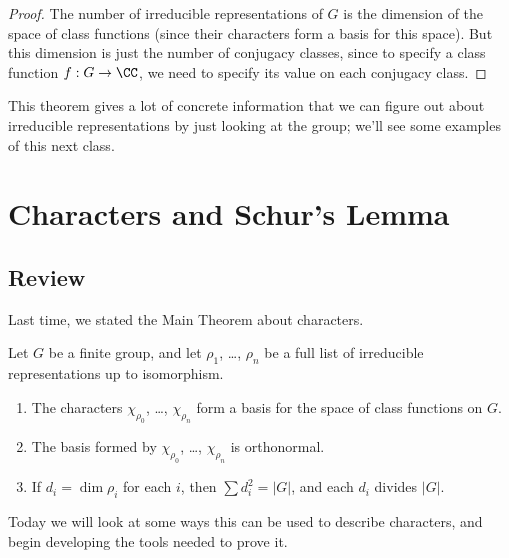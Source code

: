 \begin{proof}
The number of irreducible representations of $G$ is the dimension of the space of class functions (since their characters form a basis for this space). But this dimension is just the number of conjugacy classes, since to specify a class function $f : G \to \CC$, we need to specify its value on each conjugacy class. 
\end{proof}

This theorem gives a lot of concrete information that we can figure out about irreducible representations by just looking at the group; we'll see some examples of this next class. 




\section{Characters and Schur's Lemma}

\subsection{Review}
Last time, we stated the Main Theorem about characters. 
\begin{theorem}
Let $G$ be a finite group, and let $\rho_1$, \ldots, $\rho_n$ be a full list of irreducible representations up to isomorphism. 
\begin{enumerate}[label = (\alph*)]
    \item The characters $\chi_{\rho_0}$, \ldots, $\chi_{\rho_n}$ form a basis for the space of class functions on $G$.

    \item The basis formed by $\chi_{\rho_0}$, \ldots, $\chi_{\rho_n}$ is orthonormal.
    
    \item If $d_i = \dim \rho_i$ for each $i$, then $\sum d_i^2 = |G|$, and each $d_i$ divides $|G|$.
\end{enumerate}
\end{theorem}

Today we will look at some ways this can be used to describe characters, and begin developing the tools needed to prove it. 

